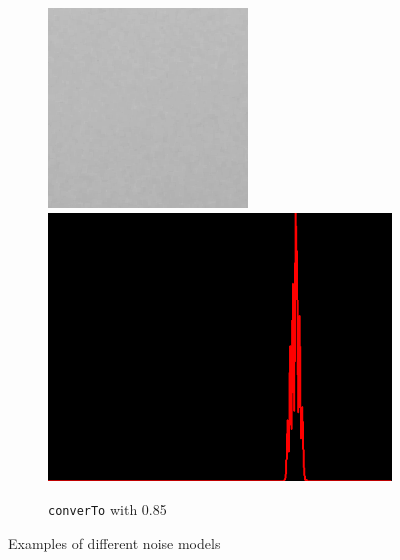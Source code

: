 \begin{figure}[H]
\begin{subfigure}[b]{0.28\textwidth}
        \begin{center}
        	\text{ }
        \end{center}
        \includegraphics[width=\textwidth]{img3/rect_0_85_contrast_5_0_85_final_img3.png}\\[0.1cm]
        \includegraphics[width=\textwidth]{img3/hist_rect_0_85_contrast_5_0_85_final_img3.png}
        \caption{\lstinline|converTo| with 0.85}
        \label{fig:img3_contrast}
    \end{subfigure}
    \caption{Examples of different noise models}
    \label{fig:noise_examples_img3}
\end{figure} 

